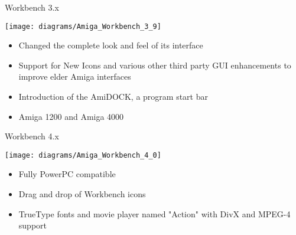 \documentclass{beamer}
\begin{document}
\begin{frame}{Workbench 3.x}
 
  \begin{center}
    \texttt{[image: diagrams/Amiga\_Workbench\_3\_9]}
  \end{center}
 
\begin{itemize}

  	\item Changed the complete look and feel of its interface 
	\item Support for New Icons and various other third party GUI enhancements to improve elder Amiga interfaces 
\item Introduction of the AmiDOCK, a program start bar
\item Amiga 1200 and Amiga 4000 

\end{itemize}
\end{frame}

\begin{frame}{Workbench 4.x}
 
  \begin{center}
    \texttt{[image: diagrams/Amiga\_Workbench\_4\_0]}
  \end{center}
 
\begin{itemize}
  	\item Fully PowerPC compatible
	\item Drag and drop of Workbench icons
	\item TrueType fonts and movie player named "Action" with DivX and MPEG-4 support
\end{itemize}
\end{frame}
\end{document}
